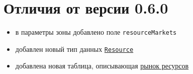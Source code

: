 \section{Отличия от версии 0.6.0}
\begin{itemize}
\item в параметры зоны добавлено поле \texttt{resourceMarkets}
\item добавлен новый тип данных \hyperref[resourceTypes]{\texttt{Resource}}
\item добавлена новая таблица, описывающая \hyperref[resourcemarket]{рынок ресурсов}
\end{itemize}
